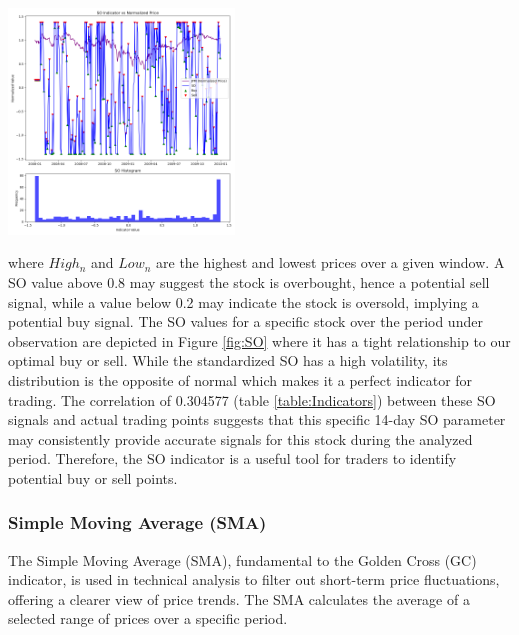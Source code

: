 \documentclass[
	letterpaper, %
]{jdf}
\begin{document}
\begin{jdffigure}
	\includegraphics[height=6cm]{Figures/SO_hist_and_price.png} \\
	\label{fig:SO}%
	\end{jdffigure}

	
where $High_{n}$ and $Low_{n}$ are the highest and lowest prices over a given window. A SO value above 0.8 may suggest the stock is overbought, hence a potential sell signal, while a value below 0.2 may indicate the stock is oversold, implying a potential buy signal. The SO values for a specific stock over the period under observation are depicted in Figure \ref{fig:SO} where it has a tight relationship to our optimal buy or sell. While the standardized SO has a high volatility, its distribution is the opposite of normal which makes it a perfect indicator for trading. The correlation of 0.304577 (table \ref{table:Indicators}) between these SO signals and actual trading points suggests that this specific 14-day SO parameter may consistently provide accurate signals for this stock during the analyzed period. Therefore, the SO indicator is a useful tool for traders to identify potential buy or sell points.

\subsubsection{Simple Moving Average (SMA)}

The Simple Moving Average (SMA), fundamental to the Golden Cross (GC) indicator, is used in technical analysis to filter out short-term price fluctuations, offering a clearer view of price trends. The SMA calculates the average of a selected range of prices over a specific period.
\end{document}
